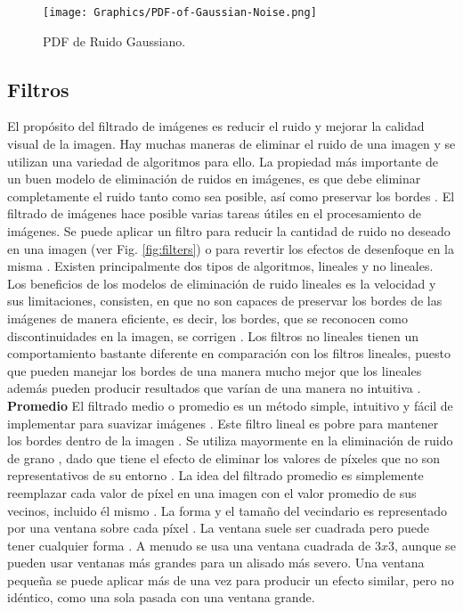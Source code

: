 \begin{figure}[h!]
    \centering
    \texttt{[image: Graphics/PDF-of-Gaussian-Noise.png]}
    \caption{PDF de Ruido Gaussiano.}
    \label{fig:PDFGaussianNoise}
\end{figure}

\subsection{Filtros}

El propósito del filtrado de imágenes es reducir el ruido y mejorar la calidad visual de la imagen. Hay muchas maneras de eliminar el ruido de una imagen y se utilizan una variedad de algoritmos \cite{MandarMeghana, PawanManojSumitAshok} para ello. La propiedad más importante de un buen modelo de eliminación de ruidos en imágenes, es que debe eliminar completamente el ruido tanto como sea posible, así como preservar los bordes \cite{PawanManojSumitAshok}. El filtrado de imágenes hace posible varias tareas útiles en el procesamiento de imágenes. Se puede aplicar un filtro para reducir la cantidad de ruido no deseado en una imagen (ver Fig. \ref{fig:filters}) o para revertir los efectos de desenfoque en la misma \cite{RuchikaGaurav}. Existen principalmente dos tipos de algoritmos, lineales y no lineales. Los beneficios de los modelos de eliminación de ruido lineales es la velocidad y sus limitaciones, consisten, en que no son capaces de preservar los bordes de las imágenes de manera eficiente, es decir, los bordes, que se reconocen como discontinuidades en la imagen, se corrigen \cite{PawanManojSumitAshok}. Los filtros no lineales tienen un comportamiento bastante diferente en comparación con los filtros lineales, puesto que pueden manejar los bordes de una manera mucho mejor que los lineales además pueden producir resultados que varían de una manera no intuitiva \cite{RuchikaGaurav}.\\

\textbf{Promedio}
El filtrado medio o promedio es un método simple, intuitivo y fácil de implementar para suavizar imágenes \cite{RajeshUday}. Este filtro lineal es pobre para mantener los bordes dentro de la imagen \cite{JamesYixinStephen}. Se utiliza mayormente en la eliminación de ruido de grano \cite{PawanManojSumitAshok}, dado que tiene el efecto de eliminar los valores de píxeles que no son representativos de su entorno \cite{RajeshUday}. La idea del filtrado promedio es simplemente reemplazar cada valor de píxel en una imagen con el valor promedio de sus vecinos, incluido él mismo \cite{RajeshUday}. La forma y el tamaño del vecindario es representado por una ventana sobre cada píxel \cite{PawanManojSumitAshok}. La ventana suele ser cuadrada pero puede tener cualquier forma \cite{MandarMeghana}. A menudo se usa una ventana cuadrada de $3 x 3$, aunque se pueden usar ventanas más grandes para un alisado más severo. Una ventana pequeña se puede aplicar más de una vez para producir un efecto similar, pero no idéntico, como una sola pasada con una ventana grande\cite{RajeshUday}.\\

